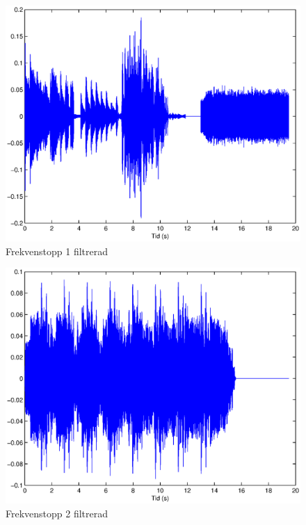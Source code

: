 \documentclass[10pt]{article}
\begin{document}
\begin{figure}[htp]
  \begin{center}
  \includegraphics[keepaspectratio=true,width=\linewidth]{topp1_filter.eps}  %
  \end{center}
  \caption{Frekvenstopp 1 filtrerad} %
  \label{fig:topp1_filter}
\end{figure}

\begin{figure}[htp]
  \begin{center}
  \includegraphics[keepaspectratio=true,width=\linewidth]{topp2_filter.eps}  %
  \end{center}
  \caption{Frekvenstopp 2 filtrerad} %
  \label{fig:topp2_filter}
\end{figure}
\end{document}
